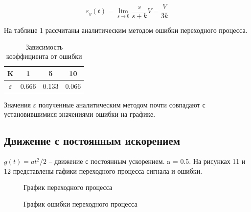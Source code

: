 \documentclass[a4paper, 11pt]{article}
\begin{document}
\begin{equation}
	\varepsilon_y(t)=\lim_{s\to0}\frac{s}{s+k}V=\frac{V}{3k}
\end{equation}

На таблице 1 рассчитаны аналитическим методом ошибки переходного процесса.

\begin{table}[h]
    \caption{Зависимость коэффициента от ошибки}
    \begin{tabular}{|c|c|c|c|}
    \hline
         K & 1 & 5 & 10 \\
         \hline
         $\varepsilon$ & 0.666 & 0.133 & 0.066 \\
    \hline     
    \end{tabular}    
    \label{tab:two}
\end{table}

Значения $\varepsilon$ полученные аналитическим методом почти совпадают с установившимися значениями ошибки на графике.\\


\subsection{Движение с постоянным искорением} $g(t)=at^2/2$ – движение с постоянным ускорением. a = 0.5. На рисунках 11 и 12 представлены гафики переходного процесса сигнала и ошибки.

\begin{figure}[h!]
    \caption{График переходного процесса}
    \label{two}
\end{figure}

\newpage

\begin{figure}[h!]
    \caption{График ошибки переходного процесса}
    \label{o:tree}
\end{figure}
\end{document}
